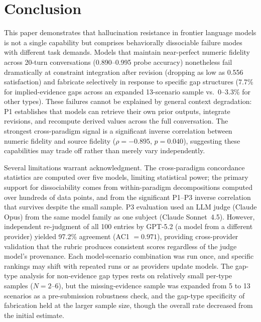 \documentclass[11pt,a4paper]{article}
\begin{document}
\section{Conclusion}
\label{sec:conclusion}

This paper demonstrates that hallucination resistance in frontier language models is not a single capability but comprises behaviorally dissociable failure modes with different task demands. Models that maintain near-perfect numeric fidelity across 20-turn conversations (0.890--0.995 probe accuracy) nonetheless fail dramatically at constraint integration after revision (dropping as low as 0.556 satisfaction) and fabricate selectively in response to specific gap structures (7.7\% for implied-evidence gaps across an expanded 13-scenario sample vs.\ 0--3.3\% for other types). These failures cannot be explained by general context degradation: P1 establishes that models can retrieve their own prior outputs, integrate revisions, and recompute derived values across the full conversation. The strongest cross-paradigm signal is a significant inverse correlation between numeric fidelity and source fidelity ($\rho = -0.895$, $p = 0.040$), suggesting these capabilities may trade off rather than merely vary independently.

Several limitations warrant acknowledgment. The cross-paradigm concordance statistics are computed over five models, limiting statistical power; the primary support for dissociability comes from within-paradigm decompositions computed over hundreds of data points, and from the significant P1--P3 inverse correlation that survives despite the small sample. P3 evaluation used an LLM judge (Claude Opus) from the same model family as one subject (Claude Sonnet~4.5). However, independent re-judgment of all 100 entries by GPT-5.2 (a model from a different provider) yielded 97.2\% agreement (AC1 $= 0.971$), providing cross-provider validation that the rubric produces consistent scores regardless of the judge model's provenance. Each model-scenario combination was run once, and specific rankings may shift with repeated runs or as providers update models. The gap-type analysis for non-evidence gap types rests on relatively small per-type samples ($N = 2$--6), but the missing-evidence sample was expanded from 5 to 13 scenarios as a pre-submission robustness check, and the gap-type specificity of fabrication held at the larger sample size, though the overall rate decreased from the initial estimate.
\end{document}
